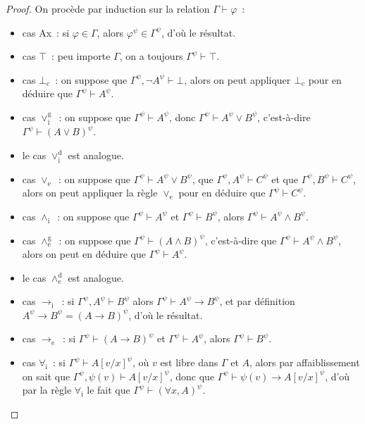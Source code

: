 \begin{proof}
  On procède par induction sur la relation $\Gamma \vdash \varphi$~:
  \begin{itemize}
  \item cas Ax~: si $\varphi \in \Gamma$, alors $\varphi^\psi \in \Gamma^\psi$,
    d'où le résultat.
  \item cas $\top$~: peu importe $\Gamma$, on a toujours
    $\Gamma^\psi \vdash \top$.
  \item cas $\bot_\mathrm c$~: on suppose que
    $\Gamma^\psi, \lnot A^\psi \vdash \bot$, alors on peut appliquer
    $\bot_\mathrm c$ pour en déduire que $\Gamma^\psi \vdash A^\psi$.
  \item cas $\lor_\mathrm i^\mathrm g$~: on suppose que
    $\Gamma^\psi \vdash A^\psi$, donc $\Gamma^\psi \vdash A^\psi\lor B^\psi$,
    c'est-à-dire $\Gamma^\psi \vdash (A\lor B)^\psi$.
  \item le cas $\lor_\mathrm i^\mathrm d$ est analogue.
  \item cas $\lor_\mathrm e$~: on suppose que
    $\Gamma^\psi\vdash A^\psi\lor B^\psi$, que $\Gamma^\psi, A^\psi \vdash C^\psi$
    et que $\Gamma^\psi,B^\psi\vdash C^\psi$, alors on peut appliquer la règle
    $\lor_\mathrm e$ pour en déduire que $\Gamma^\psi \vdash C^\psi$.
  \item cas $\land_\mathrm i$~: on suppose que $\Gamma^\psi\vdash A^\psi$ et
    $\Gamma^\psi \vdash B^\psi$, alors $\Gamma^\psi \vdash A^\psi \land B^\psi$.
  \item cas $\land_\mathrm e^\mathrm g$~: on suppose que
    $\Gamma^\psi\vdash (A\land B)^\psi$, c'est-à-dire que
    $\Gamma^\psi\vdash A^\psi \land B^\psi$, alors on peut en déduire que
    $\Gamma^\psi \vdash A^\psi$.
  \item le cas $\land_\mathrm e^\mathrm d$ est analogue.
  \item cas $\to_\mathrm i$~: si $\Gamma^\psi,A^\psi\vdash B^\psi$ alors
    $\Gamma^\psi\vdash A^\psi \to B^\psi$, et par définition
    $A^\psi\to B^\psi = (A\to B)^\psi$, d'où le résultat.
  \item cas $\to_\mathrm e$~: si $\Gamma^\psi \vdash (A\to B)^\psi$ et
    $\Gamma^\psi \vdash A^\psi$, alors $\Gamma^\psi\vdash B^\psi$.
  \item cas $\forall_\mathrm i$~: si $\Gamma^\psi\vdash A[v/x]^\psi$, où $v$ est
    libre dans $\Gamma$ et $A$, alors par affaiblissement on sait que
    $\Gamma^\psi, \psi(v)\vdash A[v/x]^\psi$, donc que
    $\Gamma^\psi\vdash \psi(v)\to A[v/x]^\psi$, d'où par la règle
    $\forall_\mathrm i$ le fait que $\Gamma^\psi \vdash (\forall x, A)^\psi$.

\end{itemize}
\end{proof}
